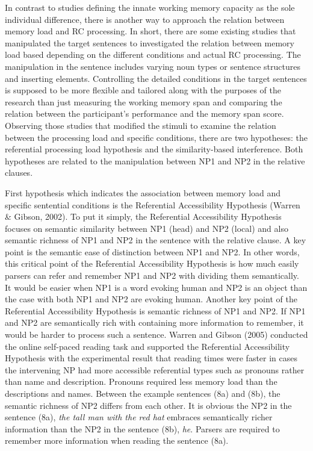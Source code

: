 \documentclass[
]{article}
\begin{document}
In contrast to studies defining the innate working memory capacity as
the sole individual difference, there is another way to approach the
relation between memory load and RC processing. In short, there are some
existing studies that manipulated the target sentences to investigated
the relation between memory load based depending on the different
conditions and actual RC processing. The manipulation in the sentence
includes varying noun types or sentence structures and inserting
elements. Controlling the detailed conditions in the target sentences is
supposed to be more flexible and tailored along with the purposes of the
research than just measuring the working memory span and comparing the
relation between the participant's performance and the memory span
score. Observing those studies that modified the stimuli to examine the
relation between the processing load and specific conditions, there are
two hypotheses: the referential processing load hypothesis and the
similarity-based interference. Both hypotheses are related to the
manipulation between NP1 and NP2 in the relative clauses.

First hypothesis which indicates the association between memory load and
specific sentential conditions is the Referential Accessibility
Hypothesis (Warren \& Gibson, 2002). To put it simply, the Referential
Accessibility Hypothesis focuses on semantic similarity between NP1
(head) and NP2 (local) and also semantic richness of NP1 and NP2 in the
sentence with the relative clause. A key point is the semantic ease of
distinction between NP1 and NP2. In other words, this critical point of
the Referential Accessibility Hypothesis is how much easily parsers can
refer and remember NP1 and NP2 with dividing them semantically. It would
be easier when NP1 is a word evoking human and NP2 is an object than the
case with both NP1 and NP2 are evoking human. Another key point of the
Referential Accessibility Hypothesis is semantic richness of NP1 and
NP2. If NP1 and NP2 are semantically rich with containing more
information to remember, it would be harder to process such a sentence.
Warren and Gibson (2005) conducted the online self-paced reading task
and supported the Referential Accessibility Hypothesis with the
experimental result that reading times were faster in cases the
intervening NP had more accessible referential types such as pronouns
rather than name and description. Pronouns required less memory load
than the descriptions and names. Between the example sentences (8a) and
(8b), the semantic richness of NP2 differs from each other. It is
obvious the NP2 in the sentence (8a), \emph{the tall man with the red
hat} embraces semantically richer information than the NP2 in the
sentence (8b), \emph{he}. Parsers are required to remember more
information when reading the sentence (8a).
\end{document}
